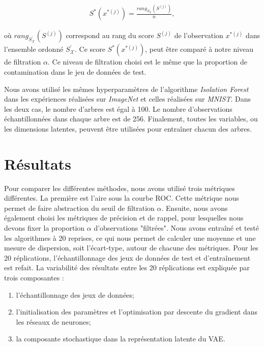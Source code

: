 \begin{gather*}
	S^*(x^{*(j)}) = \frac{rang_{S^{'}_{\mathcal{X}}}(S^{(j)})}{n},
\end{gather*}

où $rang_{S^{'}_{\mathcal{X}}}(S^{(j)})$ correspond au rang du score $S^{(j)}$ de l'observation $x^{*(j)}$ dans l'ensemble ordonné $S^{'}_{\mathcal{X}}$. Ce score $S^*(x^{*(j)})$, peut être comparé à notre niveau de filtration $\alpha$. Ce niveau de filtration choisi est le même que la proportion de contamination dans le jeu de données de test.

Nous avons utilisé les mêmes hyperparamètres de l'algorithme \textit{Isolation Forest} dans les expériences réalisées sur \textit{ImageNet} et celles réalisées sur \textit{MNIST}. Dans les deux cas, le nombre d'arbres est égal à 100. Le nombre d'observations échantillonnées dans chaque arbre est de 256. Finalement, toutes les variables, ou les dimensions latentes, peuvent être utilisées pour entraîner chacun des arbres. 	

\section{Résultats} \label{exp:results}

Pour comparer les différentes méthodes, nous avons utilisé trois métriques différentes. La première est l'aire sous la courbe ROC. Cette métrique nous permet de faire abstraction du seuil de filtration $\alpha$. Ensuite, nous avons également choisi les métriques de précision et de rappel, pour lesquelles nous devons fixer la proportion $\alpha$ d'observations "filtrées". Nous avons entraîné et testé les algorithmes à 20 reprises, ce qui nous permet de calculer une moyenne et une mesure de dispersion, soit l'écart-type, autour de chacune des métriques. Pour les 20 réplications, l'échantillonnage des jeux de données de test et d'entraînement est refait. La variabilité des résultats entre les 20 réplications est expliquée par trois composantes :

\begin{enumerate}
	\item l'échantillonnage des jeux de données;
	\item l'initialisation des paramètres et l'optimisation par descente du gradient dans les réseaux de neurones;
	\item la composante stochastique dans la représentation latente du VAE.
\end{enumerate}

